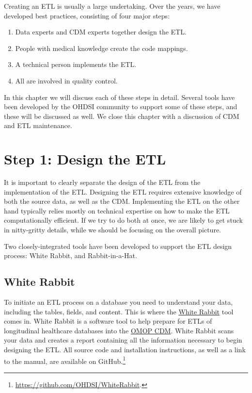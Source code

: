 \documentclass[11pt]{book}
\providecommand{\tightlist}{%
  \setlength{\itemsep}{0pt}\setlength{\parskip}{0pt}}
\let\rmarkdownfootnote\footnote%
\def\footnote{\protect\rmarkdownfootnote}
\theoremstyle{definition}
\theoremstyle{definition}
\theoremstyle{definition}
\theoremstyle{remark}
\begin{document}
Creating an ETL is usually a large undertaking. Over the years, we have
developed best practices, consisting of four major steps:

\begin{enumerate}
\def\labelenumi{\arabic{enumi}.}
\tightlist
\item
  Data experts and CDM experts together design the ETL.
\item
  People with medical knowledge create the code mappings.
\item
  A technical person implements the ETL.
\item
  All are involved in quality control.
\end{enumerate}

In this chapter we will discuss each of these steps in detail. Several
tools have been developed by the OHDSI community to support some of
these steps, and these will be discussed as well. We close this chapter
with a discussion of CDM and ETL maintenance.

\section{Step 1: Design the ETL}\label{step-1-design-the-etl}

It is important to clearly separate the design of the ETL from the
implementation of the ETL. Designing the ETL requires extensive
knowledge of both the source data, as well as the CDM. Implementing the
ETL on the other hand typically relies mostly on technical expertise on
how to make the ETL computationally efficient. If we try to do both at
once, we are likely to get stuck in nitty-gritty details, while we
should be focusing on the overall picture.

Two closely-integrated tools have been developed to support the ETL
design process: White Rabbit, and Rabbit-in-a-Hat.

\subsection{White Rabbit}\label{white-rabbit}

To initiate an ETL process on a database you need to understand your
data, including the tables, fields, and content. This is where the
\href{https://github.com/OHDSI/WhiteRabbit}{White Rabbit} tool comes in.
White Rabbit is a software tool to help prepare for ETLs of longitudinal
healthcare databases into the
\href{https://github.com/OHDSI/CommonDataModel}{OMOP CDM}. White Rabbit
scans your data and creates a report containing all the information
necessary to begin designing the ETL. All source code and installation
instructions, as well as a link to the manual, are available on
GitHub.\footnote{\url{https://github.com/OHDSI/WhiteRabbit}.}
 
\end{document}
